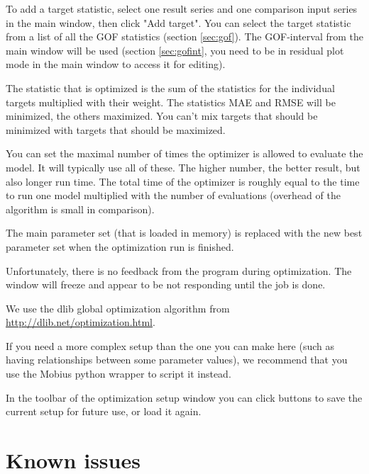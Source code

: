 \documentclass[11pt]{article}
\theoremstyle{definition}
\begin{document}
To add a target statistic, select one result series and one comparison input series in the main window, then click "Add target". You can select the target statistic from a list of all the GOF statistics (section \ref{sec:gof}). The GOF-interval from the main window will be used (section \ref{sec:gofint}, you need to be in residual plot mode in the main window to access it for editing).

The statistic that is optimized is the sum of the statistics for the individual targets multiplied with their weight. The statistics MAE and RMSE will be minimized, the others maximized. You can't mix targets that should be minimized with targets that should be maximized.

You can set the maximal number of times the optimizer is allowed to evaluate the model. It will typically use all of these. The higher number, the better result, but also longer run time. The total time of the optimizer is roughly equal to the time to run one model multiplied with the number of evaluations (overhead of the algorithm is small in comparison).

The main parameter set (that is loaded in memory) is replaced with the new best parameter set when the optimization run is finished.

Unfortunately, there is no feedback from the program during optimization. The window will freeze and appear to be not responding until the job is done.

We use the dlib global optimization algorithm from \url{http://dlib.net/optimization.html}.

If you need a more complex setup than the one you can make here (such as having relationships between some parameter values), we recommend that you use the Mobius python wrapper to script it instead.

In the toolbar of the optimization setup window you can click buttons to save the current setup for future use, or load it again.

\section{Known issues}
\end{document}
